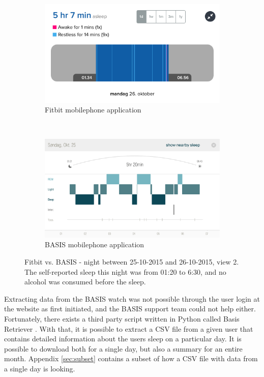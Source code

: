 \documentclass[12pt]{article} %
\begin{document}
\begin{figure}[H]
    \centering
    \begin{subfigure}[b]{0.45\textwidth}
        \includegraphics[width=\textwidth]{img/26-10-fitbit1}
        \caption{Fitbit mobilephone application}
        \label{fig:fitbit2}
    \end{subfigure}
    ~ %
    \begin{subfigure}[b]{0.45\textwidth}
        \includegraphics[width=\textwidth]{img/26-10-basis1}
        \caption{BASIS mobilephone application}
        \label{fig:basis2}
    \end{subfigure}
    \caption{Fitbit vs. BASIS - night between 25-10-2015 and 26-10-2015, view 2. The self-reported sleep this night was from 01:20 to 6:30, and no alcohol was consumed before the sleep.}
    \label{fig:pilot2}
\end{figure}

Extracting data from the BASIS watch was not possible through the user login at the website as first initiated, and the BASIS support team could not help either. Fortunately, there exists a third party script written in Python called Basis Retriever \cite{basis_retriever}. With that, it is possible to extract a CSV file from a given user that contains detailed information about the users sleep on a particular day. It is possible to download both for a single day, but also a summary for an entire month. Appendix \ref{sec:subset} contains a subset of how a CSV file with data from a single day is looking. \\
\end{document}
